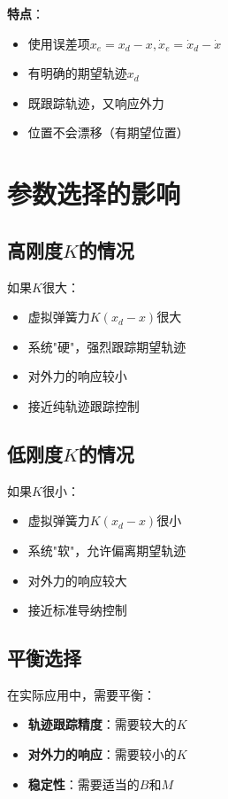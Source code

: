 \documentclass[12pt,a4paper]{article}
\begin{document}
\textbf{特点}：
\begin{itemize}
\item 使用误差项$x_e = x_d - x, \dot{x}_e = \dot{x}_d - \dot{x}$
\item 有明确的期望轨迹$x_d$
\item 既跟踪轨迹，又响应外力
\item 位置不会漂移（有期望位置）
\end{itemize}

\section{参数选择的影响}

\subsection{高刚度$K$的情况}

如果$K$很大：
\begin{itemize}
\item 虚拟弹簧力$K(x_d - x)$很大
\item 系统"硬"，强烈跟踪期望轨迹
\item 对外力的响应较小
\item 接近纯轨迹跟踪控制
\end{itemize}

\subsection{低刚度$K$的情况}

如果$K$很小：
\begin{itemize}
\item 虚拟弹簧力$K(x_d - x)$很小
\item 系统"软"，允许偏离期望轨迹
\item 对外力的响应较大
\item 接近标准导纳控制
\end{itemize}

\subsection{平衡选择}

在实际应用中，需要平衡：
\begin{itemize}
\item \textbf{轨迹跟踪精度}：需要较大的$K$
\item \textbf{对外力的响应}：需要较小的$K$
\item \textbf{稳定性}：需要适当的$B$和$M$
\end{itemize}
\end{document}
